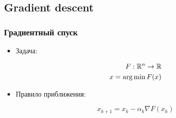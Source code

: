 \subsection{Gradient descent}

\begin{frame}
  \frametitle{Градиентный спуск}
  \begin{itemize}

    \item  Задача:

    \begin{align*}
      F : \mathbb{R}^n \rightarrow \mathbb{R} \\
      x = \operatorname*{arg\,min} F(x)
    \end{align*}
   
    \item Правило приближения:

    \begin{equation*}
      x_{k+1} = x_k - \alpha_{k} \nabla F(x_k)
    \end{equation*}

    \end{itemize}
\end{frame}

